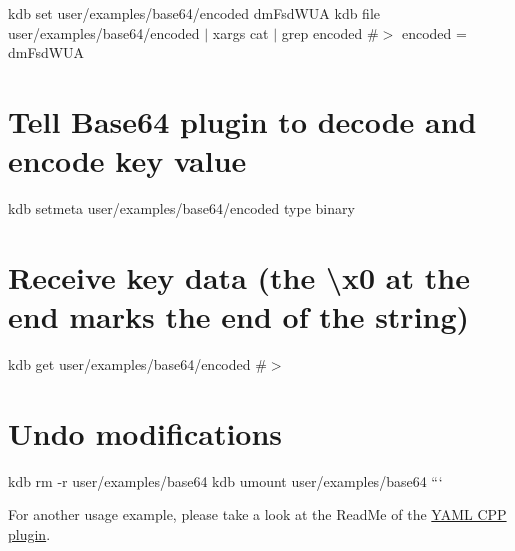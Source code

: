 kdb set user/examples/base64/encoded dm\+Fsd\+W\+UA kdb file user/examples/base64/encoded $\vert$ xargs cat $\vert$ grep encoded \#$>$ encoded = dm\+Fsd\+W\+UA

\section*{Tell Base64 plugin to decode and encode key value}

kdb setmeta user/examples/base64/encoded type binary

\section*{Receive key data (the {\ttfamily \textbackslash{}x0} at the end marks the end of the string)}

kdb get user/examples/base64/encoded \#$>$ 

\section*{Undo modifications}

kdb rm -\/r user/examples/base64 kdb umount user/examples/base64 ```

For another usage example, please take a look at the Read\+Me of the \hyperlink{md_src_plugins_yamlcpp_README_src_plugins_yamlcpp_README_md}{Y\+A\+ML C\+PP plugin}. 